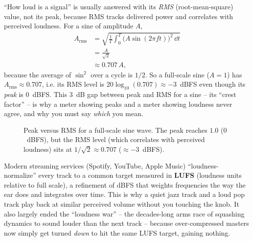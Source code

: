 \begin{example}
\label{ch26:ex-rms}
``How loud is a signal'' is usually answered with its \emph{RMS} (root-mean-square) value, not its
peak, because RMS tracks delivered power and correlates with perceived loudness. For a sine of
amplitude $A$,
\begin{align*}
  A_{\text{rms}} &= \sqrt{\frac{1}{T}\int_0^T \big(A\sin(2\pi f t)\big)^2\,\dd t} \\
                 &= \frac{A}{\sqrt{2}} \\
                 &\approx 0.707\,A,
\end{align*}
because the average of $\sin^2$ over a cycle is $1/2$. So a full-scale sine ($A = 1$) has
$A_{\text{rms}} \approx 0.707$, i.e. its RMS level is $20\log_{10}(0.707) \approx -3$~dBFS even
though its \emph{peak} is $0$~dBFS. This $3$~dB gap between peak and RMS for a sine -- its
``crest factor'' -- is why a meter showing peaks and a meter showing loudness never agree, and why
you must say \emph{which} you mean.
\end{example}

\begin{figure}[H]
\centering
{}
\caption{Peak versus RMS for a full-scale sine wave. The peak reaches $1.0$ ($0$~dBFS), but the RMS level (which correlates with perceived loudness) sits at $1/\sqrt{2} \approx 0.707$ ($\approx -3$~dBFS).}
\label{ch26:fig-peakrms}
\end{figure}


\begin{applicationbox}
Modern streaming services (Spotify, YouTube, Apple Music) ``loudness-normalize'' every track to a
common target measured in \textbf{LUFS} (loudness units relative to full scale), a refinement of
dBFS that weights frequencies the way the ear does and integrates over time. This is why a quiet
jazz track and a loud pop track play back at similar perceived volume without you touching the
knob. It also largely ended the ``loudness war'' -- the decades-long arms race of squashing
dynamics to sound louder than the next track -- because over-compressed masters now simply get
turned \emph{down} to hit the same LUFS target, gaining nothing.
\end{applicationbox}

